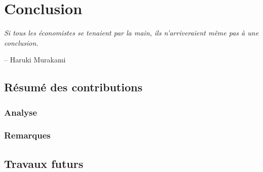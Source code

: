 \stopcontents[chapters]
\chapter*{Conclusion}
\label{chap:conclu}

\epigraph{\itshape  Si tous les économistes se tenaient par la main, ils n'arriveraient même pas à une conclusion.}{-- Haruki Murakami}

\fancyhead{}

{}
\section*{Résumé des contributions}

\lipsum[1]

\lipsum[2]

{}
\subsection*{Analyse}

\lipsum[3]

\lipsum[4]

{}
\subsection*{Remarques}

\lipsum[5]

\lipsum[6]

{}
\section*{Travaux futurs}

\lipsum[7]

\lipsum[8]
